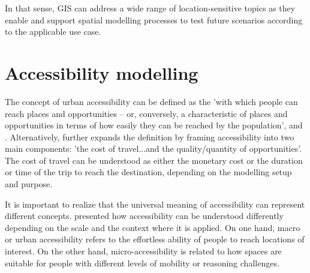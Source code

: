 \documentclass[12pt, a4paper]{report}
\begin{document}





In that sense, GIS can address a wide range of location-sensitive topics as they enable and support spatial modelling processes to test future scenarios according to the applicable use case.


\section{Accessibility modelling}

The concept of urban accessibility can be defined as the 'with which people can reach places and opportunities – or, conversely, a characteristic of places and opportunities in terms of how easily they can be reached by the population', \cite{geursAccessibilityEvaluationLanduse2004b} and \cite{neutensEquityUrbanService2010}. Alternatively, \cite{paezMeasuringAccessibilityPositive2012} further expands the definition by framing accessibility into two main components: 'the cost of travel...and the quality/quantity of opportunities'. The cost of travel can be understood as either the monetary cost or the duration or time of the trip to reach the destination, depending on the modelling setup and purpose.

It is important to realize that the universal meaning of accessibility can represent different concepts. \cite{pereiraIntroductionUrbanAccessibility2023a} presented how accessibility can be understood differently depending on the scale and the context where it is applied. On one hand, macro or urban accessibility refers to the effortless ability of people to reach locations of interest. On the other hand, micro-accessibility is related to how spaces are suitable for people with different levels of mobility or reasoning challenges. 
\end{document}
